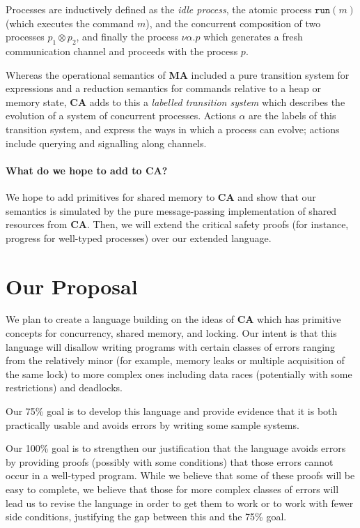 \documentclass{article}
\newcommand\Lang[1]{{\sffamily\bfseries{#1}}}
\newcommand\LangCA{\Lang{CA}}
\newcommand\LangMA{\Lang{MA}}
\begin{document}
Processes are inductively defined as the \emph{idle process}, the
atomic process $\mathtt{run}(m)$ (which executes the command $m$), and
the concurrent composition of two processes $p_1\otimes p_2$, and
finally the process $\nu\alpha.p$ which generates a fresh
communication channel and proceeds with the process $p$.

Whereas the operational semantics of \LangMA{} included a pure
transition system for expressions and a reduction semantics for
commands relative to a heap or memory state, \LangCA{} adds to this a
\emph{labelled transition system} which describes the evolution of a
system of concurrent processes. Actions $\alpha$ are the labels of
this transition system, and express the ways in which a process can
evolve; actions include querying and signalling along channels.

\paragraph{What do we hope to add to \LangCA{}?}
We hope to add primitives for shared memory to \LangCA{} and show that
our semantics is simulated by the pure message-passing implementation
of shared resources from \LangCA{}. Then, we will extend the critical
safety proofs (for instance, progress for well-typed processes) over
our extended language.

\section{Our Proposal}

We plan to create a language building on the ideas of \LangCA{} which has primitive concepts for concurrency, shared memory, and locking.
Our intent is that this language will disallow writing programs with certain classes of errors ranging from the relatively minor (for example, memory leaks or multiple acquisition of the same lock) to more complex ones including data races (potentially with some restrictions) and deadlocks.

Our 75\% goal is to develop this language and provide evidence that it is both practically usable and avoids errors by writing some sample systems.

Our 100\% goal is to strengthen our justification that the language avoids errors by providing proofs (possibly with some conditions) that those errors cannot occur in a well-typed program.
While we believe that some of these proofs will be easy to complete, we believe that those for more complex classes of errors will lead us to revise the language in order to get them to work or to work with fewer side conditions, justifying the gap between this and the 75\% goal.
\end{document}
